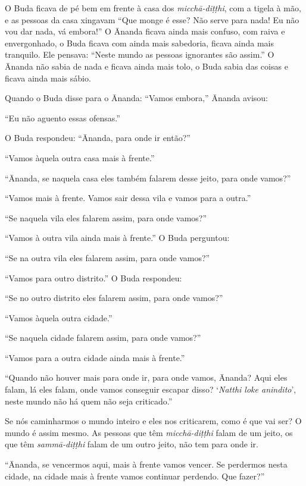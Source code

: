 O Buda ficava de pé bem em frente à casa dos
\textit{micchā-diṭṭhi}, com a tigela à mão, e as pessoas da casa
xingavam “Que monge é esse? Não serve para nada! Eu não vou dar nada,
vá embora!” O Ānanda ficava ainda mais confuso, com raiva e
envergonhado, o Buda ficava com ainda mais sabedoria, ficava ainda mais
tranquilo. Ele pensava: “Neste mundo as pessoas ignorantes são assim.”
O Ānanda não sabia de nada e ficava ainda mais tolo, o Buda sabia das
coisas e ficava ainda mais sábio. 

Quando o Buda disse para o Ānanda: “Vamos embora,” Ānanda
avisou: 

“Eu não aguento essas ofensas.” 

O Buda respondeu: “Ānanda, para onde ir então?”

“Vamos àquela outra casa mais à frente.”

“Ānanda, se naquela casa eles também falarem desse jeito, para
onde vamos?”

“Vamos mais à frente. Vamos sair dessa vila e vamos para a outra.”

“Se naquela vila eles falarem assim, para onde vamos?”

“Vamos à outra vila ainda mais à frente.” O Buda perguntou:

“Se na outra vila eles falarem assim, para onde vamos?”

“Vamos para outro distrito.” O Buda respondeu: 

“Se no outro distrito eles falarem assim, para onde vamos?”

“Vamos àquela outra cidade.”

“Se naquela cidade falarem assim, para onde vamos?”

“Vamos para a outra cidade ainda mais à frente.”

“Quando não houver mais para onde ir, para onde vamos, Ānanda?
Aqui eles falam, lá eles falam, onde vamos conseguir escapar disso?
‘\textit{Natthi loke anindito}’, neste mundo não há quem não
seja criticado.” 

Se nós caminharmos o mundo inteiro e eles nos criticarem, como é que
vai ser? O mundo é assim mesmo. As pessoas que têm
\textit{micchā-diṭṭhi} falam de um jeito, os que têm
\textit{sammā-diṭṭhi} falam de um outro jeito, não tem para onde ir. 

“Ānanda, se vencermos aqui, mais à frente vamos vencer. Se
perdermos nesta cidade, na cidade mais à frente vamos continuar
perdendo. Que fazer?”


